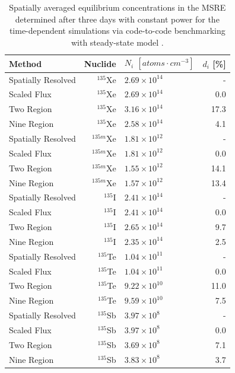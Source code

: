 \documentclass{style/nseJournal}
\begin{document}
\begin{table}[H]
    \centering
    \caption{Spatially averaged equilibrium concentrations in the MSRE determined after three days with constant power for the time-dependent simulations via code-to-code benchmarking with steady-state model \cite{shahbazi_steady-state_2022}.}
    \begin{tabular}{lrlr}
    \hline
    Method & Nuclide & $N_{i}$ $[atoms \cdot cm^{-3}]$ & $d_i$ [\%]\\
    \hline
    Spatially Resolved & $^{135}$Xe & $2.69 \times 10^{14}$ & - \\
    Scaled Flux & $^{135}$Xe & $2.69 \times 10^{14}$ & 0.0 \\
    Two Region \cite{shahbazi_steady-state_2022} & $^{135}$Xe & $3.16 \times 10^{14}$ & 17.3 \\
    Nine Region \cite{shahbazi_steady-state_2022} & $^{135}$Xe & $2.58 \times 10^{14}$ & 4.1 \\
    Spatially Resolved & $^{135m}$Xe & $1.81 \times 10^{12}$ & - \\
    Scaled Flux & $^{135m}$Xe & $1.81 \times 10^{12}$ & 0.0 \\
    Two Region \cite{shahbazi_steady-state_2022} & $^{135m}$Xe & $1.55 \times 10^{12}$ & 14.1 \\
    Nine Region \cite{shahbazi_steady-state_2022} & $^{135m}$Xe & $1.57 \times 10^{12}$ & 13.4 \\
    Spatially Resolved & $^{135}$I & $2.41 \times 10^{14}$ & - \\
    Scaled Flux & $^{135}$I & $2.41 \times 10^{14}$ & 0.0 \\
    Two Region \cite{shahbazi_steady-state_2022} & $^{135}$I & $2.65 \times 10^{14}$ & 9.7 \\
    Nine Region \cite{shahbazi_steady-state_2022} & $^{135}$I & $2.35 \times 10^{14}$ & 2.5 \\
    Spatially Resolved & $^{135}$Te & $1.04 \times 10^{11}$ & - \\
    Scaled Flux & $^{135}$Te & $1.04 \times 10^{11}$ & 0.0 \\
    Two Region \cite{shahbazi_steady-state_2022} & $^{135}$Te & $9.22 \times 10^{10}$ & 11.0 \\
    Nine Region \cite{shahbazi_steady-state_2022} & $^{135}$Te & $9.59 \times 10^{10}$ & 7.5 \\
    Spatially Resolved & $^{135}$Sb & $3.97 \times 10^{8}$ & - \\
    Scaled Flux & $^{135}$Sb & $3.97 \times 10^{8}$ & 0.0 \\
    Two Region \cite{shahbazi_steady-state_2022} & $^{135}$Sb & $3.69 \times 10^{8}$ & 7.1 \\
    Nine Region \cite{shahbazi_steady-state_2022} & $^{135}$Sb & $3.83 \times 10^{8}$ & 3.7 \\
    \hline
    \end{tabular}
    \label{tab:mortycompare}
\end{table}
\end{document}
